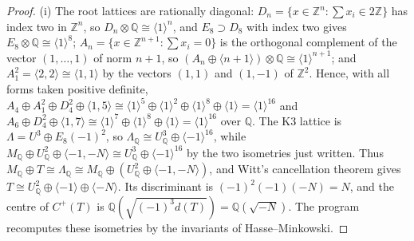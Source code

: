 \documentclass[11pt,reqno]{amsart}
\numberwithin{equation}{section}
\theoremstyle{plain}
\theoremstyle{definition}
\newcommand{\QQ}{\mathbb{Q}}
\newcommand{\ZZ}{\mathbb{Z}}
\begin{document}
\begin{proof}
(i) The root lattices are rationally diagonal: $D_{n}=\{x\in\ZZ^{n}:\sum x_{i}\in2\ZZ\}$ has index two in $\ZZ^{n}$, so $D_{n}\otimes\QQ\cong\langle1\rangle^{n}$, and $E_{8}\supset D_{8}$ with index two gives $E_{8}\otimes\QQ\cong\langle1\rangle^{8}$; $A_{n}=\{x\in\ZZ^{n+1}:\sum x_{i}=0\}$ is the orthogonal complement of the vector $(1,\dots,1)$ of norm $n+1$, so $(A_{n}\oplus\langle n+1\rangle)\otimes\QQ\cong\langle1\rangle^{n+1}$; and $A_{1}^{2}=\langle2,2\rangle\cong\langle1,1\rangle$ by the vectors $(1,1)$ and $(1,-1)$ of $\ZZ^{2}$. Hence, with all forms taken positive definite, $A_{4}\oplus A_{1}^{2}\oplus D_{4}^{2}\oplus\langle1,5\rangle\cong\langle1\rangle^{5}\oplus\langle1\rangle^{2}\oplus\langle1\rangle^{8}\oplus\langle1\rangle=\langle1\rangle^{16}$ and $A_{6}\oplus D_{4}^{2}\oplus\langle1,7\rangle\cong\langle1\rangle^{7}\oplus\langle1\rangle^{8}\oplus\langle1\rangle=\langle1\rangle^{16}$ over $\QQ$. The K3 lattice is $\Lambda=U^{3}\oplus E_{8}(-1)^{2}$, so $\Lambda_{\QQ}\cong U_{\QQ}^{3}\oplus\langle-1\rangle^{16}$, while $M_{\QQ}\oplus U_{\QQ}^{2}\oplus\langle-1,-N\rangle\cong U_{\QQ}^{3}\oplus\langle-1\rangle^{16}$ by the two isometries just written. Thus $M_{\QQ}\oplus T\cong\Lambda_{\QQ}\cong M_{\QQ}\oplus(U_{\QQ}^{2}\oplus\langle-1,-N\rangle)$, and Witt's cancellation theorem gives $T\cong U_{\QQ}^{2}\oplus\langle-1\rangle\oplus\langle-N\rangle$. Its discriminant is $(-1)^{2}(-1)(-N)=N$, and the centre of $C^{+}(T)$ is $\QQ(\sqrt{(-1)^{3}d(T)})=\QQ(\sqrt{-N})$. The program  recomputes these isometries by the invariants of Hasse--Minkowski.


\end{proof}
\end{document}
